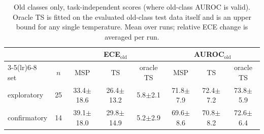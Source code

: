 \begin{table}[t]\centering\small
\caption{Old classes only, task-independent scores (where old-class AUROC is valid). Oracle TS is fitted on the evaluated old-class test data itself and is an upper bound for any single temperature. Mean over runs; relative ECE change is averaged per run.}\label{tab:oracle}
\begin{tabular}{lc ccc ccc}\toprule
 & & \multicolumn{3}{c}{ECE$_\mathrm{old}$} & \multicolumn{3}{c}{AUROC$_\mathrm{old}$}\\
\cmidrule(lr){3-5}\cmidrule(lr){6-8}
set & $n$ & MSP & TS & oracle TS & MSP & TS & oracle TS\\\midrule
exploratory & 25 & 33.4{\scriptsize$\pm$18.6} & 26.4{\scriptsize$\pm$13.2} & 5.8{\scriptsize$\pm$2.1} & 71.8{\scriptsize$\pm$7.9} & 72.4{\scriptsize$\pm$7.2} & 73.8{\scriptsize$\pm$5.9}\\
confirmatory & 14 & 39.1{\scriptsize$\pm$18.0} & 29.8{\scriptsize$\pm$14.9} & 5.2{\scriptsize$\pm$2.9} & 69.6{\scriptsize$\pm$8.6} & 70.8{\scriptsize$\pm$8.2} & 72.6{\scriptsize$\pm$6.4}\\
\bottomrule\end{tabular}
\end{table}
